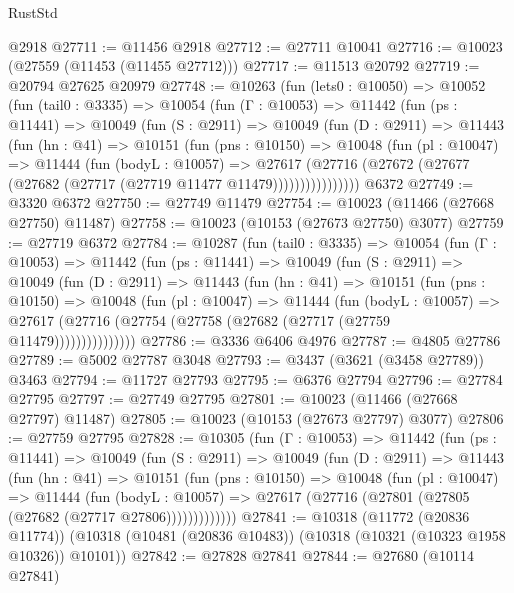 \begin{lexlean}{RustStd}
\begin{coremodule}
    @2918
@27711 := @11456 @2918
@27712 := @27711 @10041
@27716 := @10023 (@27559 (@11453 (@11455 @27712)))
@27717 := @11513 @20792
@27719 := @20794 @27625 @20979
@27748 := @10263
    (fun (lets0 : @10050) =>
    @10052
      (fun (tail0 : @3335) =>
      @10054
        (fun (Γ : @10053) =>
        @11442
          (fun (ps : @11441) =>
          @10049
            (fun (S : @2911) =>
            @10049
              (fun (D : @2911) =>
              @11443
                (fun (hn : @41) =>
                @10151
                  (fun (pns : @10150) =>
                  @10048
                    (fun (pl : @10047) =>
                    @11444
                      (fun (bodyL : @10057) =>
                      @27617
                        (@27716
                          (@27672 (@27677 (@27682 (@27717 (@27719 @11477 @11479))))))))))))))))
    @6372
@27749 := @3320 @6372
@27750 := @27749 @11479
@27754 := @10023 (@11466 (@27668 @27750) @11487)
@27758 := @10023 (@10153 (@27673 @27750) @3077)
@27759 := @27719 @6372
@27784 := @10287
    (fun (tail0 : @3335) =>
    @10054
      (fun (Γ : @10053) =>
      @11442
        (fun (ps : @11441) =>
        @10049
          (fun (S : @2911) =>
          @10049
            (fun (D : @2911) =>
            @11443
              (fun (hn : @41) =>
              @10151
                (fun (pns : @10150) =>
                @10048
                  (fun (pl : @10047) =>
                  @11444
                    (fun (bodyL : @10057) =>
                    @27617 (@27716 (@27754 (@27758 (@27682 (@27717 (@27759 @11479)))))))))))))))
@27786 := @3336 @6406 @4976
@27787 := @4805 @27786
@27789 := @5002 @27787 @3048
@27793 := @3437 (@3621 (@3458 @27789)) @3463
@27794 := @11727 @27793
@27795 := @6376 @27794
@27796 := @27784 @27795
@27797 := @27749 @27795
@27801 := @10023 (@11466 (@27668 @27797) @11487)
@27805 := @10023 (@10153 (@27673 @27797) @3077)
@27806 := @27759 @27795
@27828 := @10305
    (fun (Γ : @10053) =>
    @11442
      (fun (ps : @11441) =>
      @10049
        (fun (S : @2911) =>
        @10049
          (fun (D : @2911) =>
          @11443
            (fun (hn : @41) =>
            @10151
              (fun (pns : @10150) =>
              @10048
                (fun (pl : @10047) =>
                @11444
                  (fun (bodyL : @10057) =>
                  @27617 (@27716 (@27801 (@27805 (@27682 (@27717 @27806)))))))))))))
@27841 := @10318
    (@11772 (@20836 @11774))
    (@10318 (@10481 (@20836 @10483)) (@10318 (@10321 (@10323 @1958 @10326)) @10101))
@27842 := @27828 @27841
@27844 := @27680 (@10114 @27841)

\end{coremodule}
\end{lexlean}

